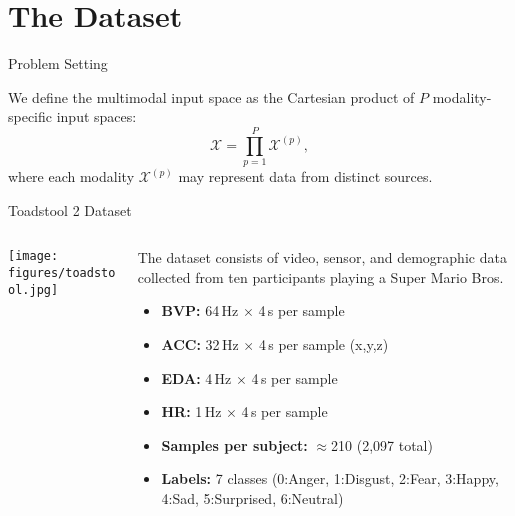 \section{The Dataset}

\begin{frame}{Problem Setting}
	\begin{block}{}
		We define the multimodal input space as the Cartesian product of $P$ modality-specific input spaces:
		\[
		\mathcal{X} = \prod_{p=1}^{P} \mathcal{X}^{(p)},
		\]
		where each modality $\mathcal{X}^{(p)}$ may represent data from distinct sources.
	\end{block}
	
\end{frame}



\begin{frame}{Toadstool 2 Dataset}
		\begin{columns}[T] %
		\begin{column}{0.45\textwidth}
			\texttt{[image: figures/toadstool.jpg]}
			
		\end{column}
		\begin{column}{0.55\textwidth}
			\begin{block}{}
				The dataset consists of video, sensor, and demographic data collected from ten participants playing a Super Mario Bros.
			\end{block}

		
		\begin{itemize}
			\item \textbf{BVP:} 64\,Hz $\times$ 4\,s per sample
			\item \textbf{ACC:} 32\,Hz $\times$ 4\,s per sample (x,y,z)
			\item \textbf{EDA:} 4\,Hz $\times$ 4\,s per sample
			\item \textbf{HR:} 1\,Hz $\times$ 4\,s per sample
			\item \textbf{Samples per subject:} $\approx$210 (2,097 total)
			\item \textbf{Labels:} 7 classes (0:Anger, 1:Disgust, 2:Fear, 3:Happy, 4:Sad, 5:Surprised, 6:Neutral)
		\end{itemize} 


		\end{column}
	\end{columns}
\end{frame}


